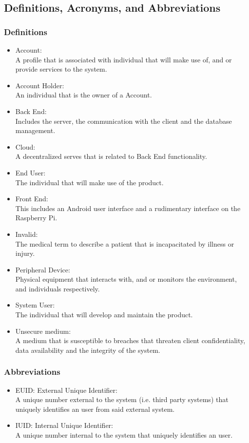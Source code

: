 \subsection{Definitions, Acronyms, and Abbreviations}
\subsubsection{Definitions}
	\begin{itemize}
		\item Account:\\ A profile that is associated with individual that will make use of, and or provide services to the system.
		\item Account Holder:\\ An individual that is the owner of a Account.
		\item Back End:\\ Includes the server, the communication with the client and the database management.
		\item Cloud:\\ A decentralized serves that is related to Back End functionality.
		\item End User:\\ The individual that will make use of the product.
		\item Front End:\\ This includes an Android user interface and a rudimentary interface on the Raspberry Pi.
		\item Invalid:\\ The medical term to describe a patient that is  incapacitated by illness or injury.
		\item Peripheral Device:\\  Physical equipment that interacts with, and or monitors the environment, and individuals respectively.
		\item System User:\\ The individual that will develop and maintain the product.
		\item Unsecure medium:\\ A medium that is susceptible to breaches that threaten client confidentiality, data availability and the integrity of the system.
	\end{itemize}
\subsubsection{Abbreviations}
	\begin{itemize}
		\item EUID: External Unique Identifier:\\ A unique number external to the system (i.e. third party systems) that uniquely identifies an user from said external system.
		\item IUID: Internal Unique Identifier:\\ A unique number internal to the system that uniquely identifies an user.
	\end{itemize}
